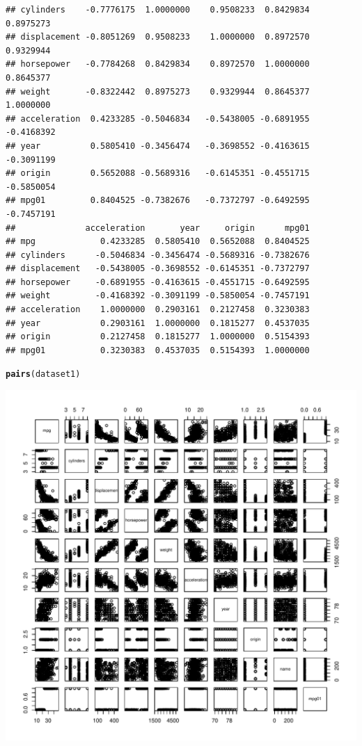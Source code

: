 \documentclass{article}\usepackage[]{graphicx}\usepackage[]{color}
\makeatletter
\def\maxwidth{ %
  \ifdim\Gin@nat@width>\linewidth
    \linewidth
  \else
    \Gin@nat@width
  \fi
}
\newcommand{\hlstd}[1]{\textcolor[rgb]{0.345,0.345,0.345}{#1}}%
\newcommand{\hlkwd}[1]{\textcolor[rgb]{0.737,0.353,0.396}{\textbf{#1}}}%
\newenvironment{kframe}{%
 \def\at@end@of@kframe{}%
 \ifinner\ifhmode%
  \def\at@end@of@kframe{\end{minipage}}%
  \begin{minipage}{\columnwidth}%
 \fi\fi%
 \def\FrameCommand##1{\hskip\@totalleftmargin \hskip-\fboxsep
 \colorbox{shadecolor}{##1}\hskip-\fboxsep
     \hskip-\linewidth \hskip-\@totalleftmargin \hskip\columnwidth}%
 \MakeFramed {\advance\hsize-\width
   \@totalleftmargin\z@ \linewidth\hsize
   \@setminipage}}%
 {\par\unskip\endMakeFramed%
 \at@end@of@kframe}
\newenvironment{knitrout}{}{} %
\makeatother
\begin{document}
\begin{enumerate}[(a)]
\begin{knitrout}
\begin{kframe}
\begin{verbatim}
## cylinders    -0.7776175  1.0000000    0.9508233  0.8429834  0.8975273
## displacement -0.8051269  0.9508233    1.0000000  0.8972570  0.9329944
## horsepower   -0.7784268  0.8429834    0.8972570  1.0000000  0.8645377
## weight       -0.8322442  0.8975273    0.9329944  0.8645377  1.0000000
## acceleration  0.4233285 -0.5046834   -0.5438005 -0.6891955 -0.4168392
## year          0.5805410 -0.3456474   -0.3698552 -0.4163615 -0.3091199
## origin        0.5652088 -0.5689316   -0.6145351 -0.4551715 -0.5850054
## mpg01         0.8404525 -0.7382676   -0.7372797 -0.6492595 -0.7457191
##              acceleration       year     origin      mpg01
## mpg             0.4233285  0.5805410  0.5652088  0.8404525
## cylinders      -0.5046834 -0.3456474 -0.5689316 -0.7382676
## displacement   -0.5438005 -0.3698552 -0.6145351 -0.7372797
## horsepower     -0.6891955 -0.4163615 -0.4551715 -0.6492595
## weight         -0.4168392 -0.3091199 -0.5850054 -0.7457191
## acceleration    1.0000000  0.2903161  0.2127458  0.3230383
## year            0.2903161  1.0000000  0.1815277  0.4537035
## origin          0.2127458  0.1815277  1.0000000  0.5154393
## mpg01           0.3230383  0.4537035  0.5154393  1.0000000
\end{verbatim}
\begin{alltt}
\hlkwd{pairs}\hlstd{(dataset1)}
\end{alltt}
\end{kframe}
\includegraphics[width=\maxwidth]{figure/unnamed-chunk-7-1} 

\end{knitrout}
\end{enumerate}
\end{document}
